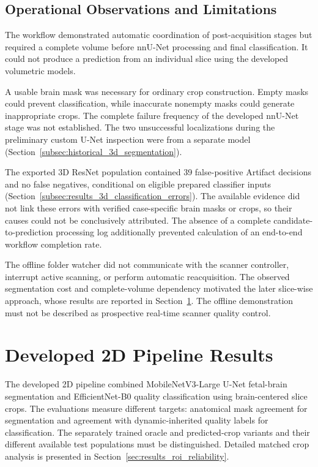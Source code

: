 \subsection{Operational Observations and Limitations}
\label{subsec:results_3d_pipeline_failures}

The workflow demonstrated automatic coordination of post-acquisition stages but required a complete volume before nnU-Net processing and final classification. It could not produce a prediction from an individual slice using the developed volumetric models.

A usable brain mask was necessary for ordinary crop construction. Empty masks could prevent classification, while inaccurate nonempty masks could generate inappropriate crops. The complete failure frequency of the developed nnU-Net stage was not established. The two unsuccessful localizations during the preliminary custom U-Net inspection were from a separate model (Section~\ref{subsec:historical_3d_segmentation}).

The exported 3D ResNet population contained 39 false-positive Artifact decisions and no false negatives, conditional on eligible prepared classifier inputs (Section~\ref{subsec:results_3d_classification_errors}). The available evidence did not link these errors with verified case-specific brain masks or crops, so their causes could not be conclusively attributed. The absence of a complete candidate-to-prediction processing log additionally prevented calculation of an end-to-end workflow completion rate.

The offline folder watcher did not communicate with the scanner controller, interrupt active scanning, or perform automatic reacquisition. The observed segmentation cost and complete-volume dependency motivated the later slice-wise approach, whose results are reported in Section~\ref{sec:results_2d_segmentation}. The offline demonstration must not be described as prospective real-time scanner quality control.

\section{Developed 2D Pipeline Results}
\label{sec:results_2d_segmentation}

The developed 2D pipeline combined MobileNetV3-Large U-Net fetal-brain segmentation and EfficientNet-B0 quality classification using brain-centered slice crops. The evaluations measure different targets: anatomical mask agreement for segmentation and agreement with dynamic-inherited quality labels for classification. The separately trained oracle and predicted-crop variants and their different available test populations must be distinguished. Detailed matched crop analysis is presented in Section~\ref{sec:results_roi_reliability}.

